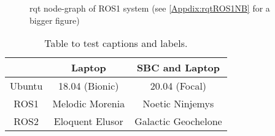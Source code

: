 \begin{figure}[H]
\centering

  \caption{rqt node-graph of ROS1 system (see \ref{Appdix:rqtROS1NB} for a bigger figure)}
  \label{fig:rqt:ros1_noBridge}
\end{figure}


\begin{table}[h!]
\centering
\begin{tabular}{c |c| c}
                &   Laptop              &   SBC and Laptop  \\
    \hline
    Ubuntu      &   18.04 (Bionic)      &   20.04 (Focal)   \\
    \hline
    ROS1        &   Melodic Morenia     &   Noetic Ninjemys \\  
    \hline
    ROS2        &   Eloquent Elusor     &   Galactic Geochelone\\
\end{tabular}
\caption{Table to test captions and labels.}
\label{table:1}
\end{table}